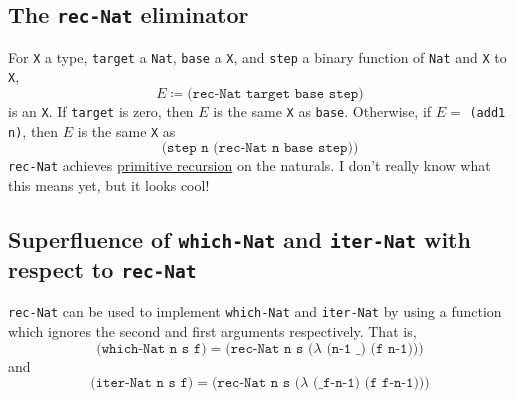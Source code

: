 \documentclass{article}
\newcommand{\ttt}[1]{\texttt{#1}}
\begin{document}
\subsection{The \ttt{rec-Nat} eliminator} \label{rec-nat-elim}
For \ttt{X} a type, \ttt{target} a \ttt{Nat}, \ttt{base} a \ttt{X}, and \ttt{step} a binary function of \ttt{Nat} and \ttt{X} to \ttt{X}, \[ E \coloneqq \ttt{(rec-Nat target base step)} \] is an \ttt{X}. If \ttt{target} is zero, then \(E\) is the same \ttt{X} as \ttt{base}. Otherwise, if \(E = \) \ttt{(add1 n)}, then \(E\) is the same \ttt{X} as \[
    \ttt{(step n (rec-Nat n base step))}
\]
\ttt{rec-Nat} achieves \href{https://en.wikipedia.org/wiki/Primitive_recursive_function}{primitive recursion} on the naturals. I don't really know what this means yet, but it looks cool!
\subsection{Superfluence of \ttt{which-Nat} and \ttt{iter-Nat} with respect to \ttt{rec-Nat}}
\ttt{rec-Nat} can be used to implement \ttt{which-Nat} and \ttt{iter-Nat} by using a function which ignores the second and first arguments respectively. That is, \[
    \ttt{(which-Nat n s f)} = \ttt{(rec-Nat n s (\(\lambda\) (n-1 \_) (f n-1)))}
\]
and \[
    \ttt{(iter-Nat n s f)} = \ttt{(rec-Nat n s (\(\lambda\) (\_ f-n-1) (f f-n-1)))}
\]
\end{document}
